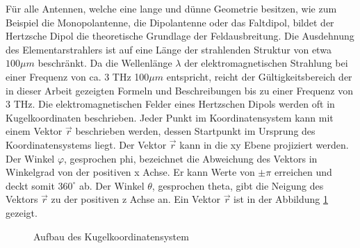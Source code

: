 Für alle Antennen, welche eine lange und dünne Geometrie besitzen, wie zum Beispiel die Monopolantenne, die Dipolantenne oder das Faltdipol, bildet der Hertzsche Dipol die theoretische Grundlage der Feldausbreitung. Die Ausdehnung des Elementarstrahlers ist auf eine Länge der strahlenden Struktur von etwa $100\mu m$ beschränkt. Da die Wellenlänge $\lambda$ der elektromagnetischen Strahlung bei einer Frequenz von ca. 3 THz 100$\mu m$ entspricht, reicht der Gültigkeitsbereich der in dieser Arbeit gezeigten Formeln und Beschreibungen bis zu einer Frequenz von 3 THz.
Die elektromagnetischen Felder eines Hertzschen Dipols werden oft in Kugelkoordinaten beschrieben. Jeder Punkt im Koordinatensystem kann mit einem Vektor $\vec{r}$ beschrieben werden, dessen Startpunkt im Ursprung des Koordinatensystems liegt. Der Vektor $\vec{r}$ kann in die xy Ebene projiziert werden. Der Winkel $\varphi$, gesprochen phi, bezeichnet die Abweichung des Vektors in Winkelgrad von der positiven x Achse. Er kann Werte von $\pm \pi$ erreichen und deckt somit $360^\circ$ ab. Der Winkel $\theta$, gesprochen theta, gibt die Neigung  des Vektors $\vec{r}$ zu der positiven z Achse an. Ein Vektor $\vec{r}$ ist in der Abbildung \ref{FerdVektor} gezeigt.




\begin{figure}[!ht]
\begin{center}
\end{center}
	\caption{Aufbau des Kugelkoordinatensystem}
	\label{FerdVektor}
\end{figure}

